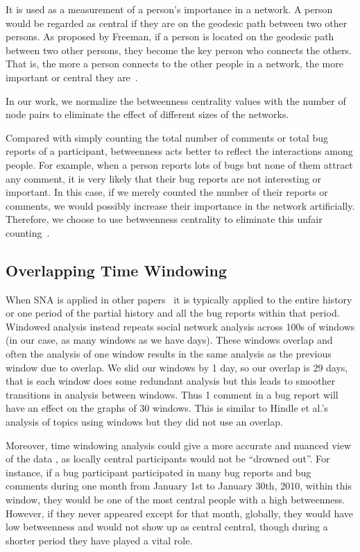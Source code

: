 \documentclass[10pt, conference, compsocconf]{IEEEtran}
\begin{document}
It is used as a measurement of a person's importance in a network. 
A person would be regarded as central if they are on the geodesic path
between two other persons. 
As proposed by Freeman, if a person is located
on the geodesic path between two other persons, they become the key
person who connects the others. 
That is, the more a person connects to
the other people in a network, the more important or central they 
are~\cite{BOOK:han}.


In our work, we normalize the betweenness centrality values with the
number of node pairs to eliminate the effect of different sizes of the
networks.


Compared with simply counting the total number of comments or total
bug reports of a participant, betweenness acts better to reflect the
interactions among people. For example, when a person reports lots of
bugs but none of them attract any comment, it is very likely that
their bug reports are not interesting or important. In this case, if
we merely counted the number of their reports or comments, we would
possibly increase their importance in the network
artificially. Therefore, we choose to use betweenness centrality to
eliminate this unfair counting~\cite{ICSEsocio:la}.


\subsection{Overlapping Time Windowing}

When SNA is applied in other
papers~\cite{MSR:christ,ICSEsocio:meneely} it is typically applied to
the entire history or one period of the partial history and all the
bug reports within that period.
Windowed analysis instead repeats social network analysis across 100s
of windows (in our case, as many windows as we have days). These
windows overlap and often the analysis of one window results in the
same analysis as the previous window due to overlap. We slid our
windows by 1 day, so our overlap is 29 days, that is each window does
some redundant analysis but this leads to smoother transitions in
analysis between windows. Thus 1 comment in a bug report will have an
effect on the graphs of 30 windows. This is similar to Hindle et
al.'s\cite{ICSMwindowed:hindle} analysis of topics using windows but
they did not use an overlap.

Moreover, time windowing analysis could give a more accurate and
nuanced view of the data \cite{ICSEsocio:meneely}
\cite{ICSMwindowed:hindle}, as locally central participants would not
be ``drowned out''. For instance, if a
bug participant participated in many bug reports and bug comments during one
month from January 1st to January 30th, 2010, within this window, they
would be one of the most central people with a high
betweenness. However, if they never appeared except for that
month, globally, they would have low betweenness and would not show up
as central
central, though during a shorter period they have played a vital role. 
\end{document}
